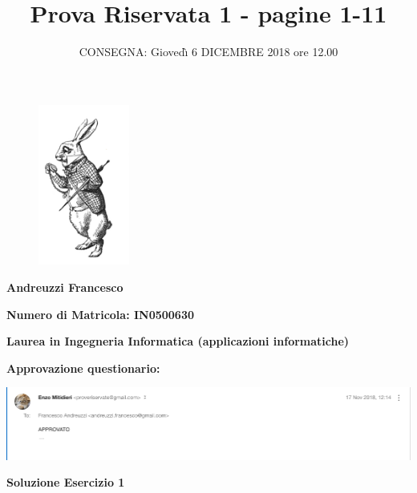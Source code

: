 \documentclass[11pt,reqno]{amsart}
\title{Prova Riservata 1 -  pagine 1-11
}
\author{CONSEGNA: Gioved\`{\i} 6 DICEMBRE 2018 ore 12.00}
\begin{document}
\maketitle

\begin{figure}[ht!]
\centering
\includegraphics[width=30mm]{cunicio.jpg}
\end{figure}

{\bf Andreuzzi Francesco}

\bigskip
{\bf Numero di Matricola: IN0500630}

\bigskip
{\bf Laurea in Ingegneria Informatica (applicazioni informatiche)}

\bigskip

\bigskip

{\bf Approvazione questionario:}
\bigskip

\includegraphics[width=165mm]{curriculum.png}

\newpage

\centerline{\bf Soluzione Esercizio 1 }
\bigskip
\end{document}
